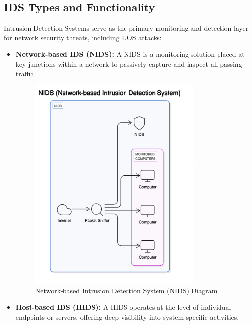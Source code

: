 \documentclass[16pt]{report}
\begin{document}
\subsection{IDS Types and Functionality}
Intrusion Detection Systems serve as the primary monitoring and detection layer for network security threats, including DOS attacks:
\begin{itemize}
    \item \textbf{Network-based IDS (NIDS):} A NIDS is a monitoring solution placed at key junctions within a network to passively capture and inspect all passing traffic.
        \begin{figure}[ht]
            \centering
            \includegraphics[width=0.8\textwidth]{images/nids-diagram.png}
            \caption{Network-based Intrusion Detection System (NIDS) Diagram}
            \label{fig:nids-diagram}
        \end{figure}
    \item \textbf{Host-based IDS (HIDS):} A HIDS operates at the level of individual endpoints or servers, offering deep visibility into system-specific activities.
        \begin{figure}[ht]
            \centering

\end{figure}
\end{itemize}
\end{document}
